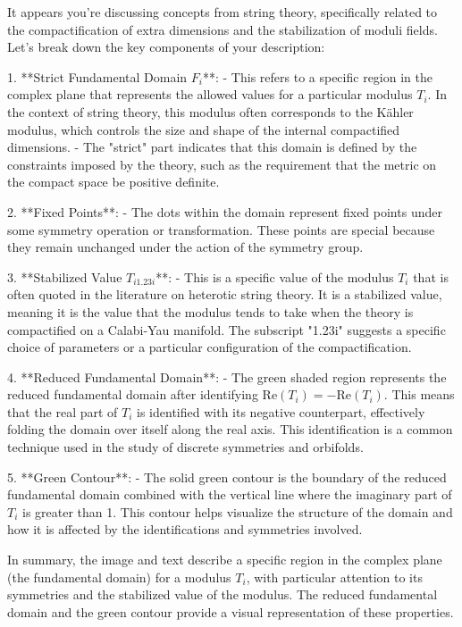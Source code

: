 It appears you're discussing concepts from string theory, specifically related to the compactification of extra dimensions and the stabilization of moduli fields. Let's break down the key components of your description:

1. **Strict Fundamental Domain \( F_i \)**:
   - This refers to a specific region in the complex plane that represents the allowed values for a particular modulus \( T_i \). In the context of string theory, this modulus often corresponds to the Kähler modulus, which controls the size and shape of the internal compactified dimensions.
   - The "strict" part indicates that this domain is defined by the constraints imposed by the theory, such as the requirement that the metric on the compact space be positive definite.

2. **Fixed Points**:
   - The dots within the domain represent fixed points under some symmetry operation or transformation. These points are special because they remain unchanged under the action of the symmetry group.

3. **Stabilized Value \( T_{i1.23i} \)**:
   - This is a specific value of the modulus \( T_i \) that is often quoted in the literature on heterotic string theory. It is a stabilized value, meaning it is the value that the modulus tends to take when the theory is compactified on a Calabi-Yau manifold. The subscript "1.23i" suggests a specific choice of parameters or a particular configuration of the compactification.

4. **Reduced Fundamental Domain**:
   - The green shaded region represents the reduced fundamental domain after identifying \( \text{Re}(T_i) = -\text{Re}(T_i) \). This means that the real part of \( T_i \) is identified with its negative counterpart, effectively folding the domain over itself along the real axis. This identification is a common technique used in the study of discrete symmetries and orbifolds.

5. **Green Contour**:
   - The solid green contour is the boundary of the reduced fundamental domain combined with the vertical line where the imaginary part of \( T_i \) is greater than 1. This contour helps visualize the structure of the domain and how it is affected by the identifications and symmetries involved.

In summary, the image and text describe a specific region in the complex plane (the fundamental domain) for a modulus \( T_i \), with particular attention to its symmetries and the stabilized value of the modulus. The reduced fundamental domain and the green contour provide a visual representation of these properties.